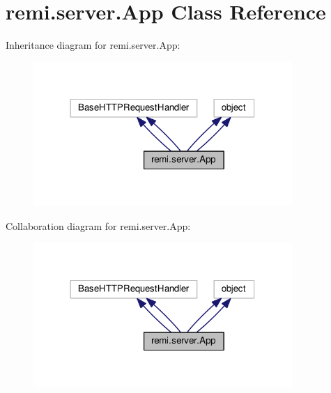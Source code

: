 \hypertarget{classremi_1_1server_1_1App}{}\section{remi.\+server.\+App Class Reference}
\label{classremi_1_1server_1_1App}


Inheritance diagram for remi.\+server.\+App\+:
\nopagebreak
\begin{figure}[H]
\begin{center}
\leavevmode
\includegraphics[width=278pt]{d4/d5f/classremi_1_1server_1_1App__inherit__graph}
\end{center}
\end{figure}


Collaboration diagram for remi.\+server.\+App\+:
\nopagebreak
\begin{figure}[H]
\begin{center}
\leavevmode
\includegraphics[width=278pt]{db/d9a/classremi_1_1server_1_1App__coll__graph}
\end{center}
\end{figure}
